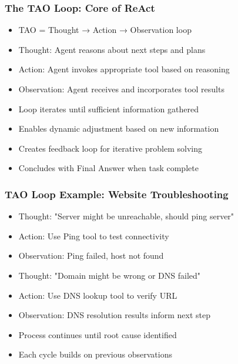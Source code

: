 \begin{frame}[fragile]\frametitle{The TAO Loop: Core of ReAct}
      \begin{itemize}
	  \item TAO = Thought → Action → Observation loop
	  \item Thought: Agent reasons about next steps and plans
	  \item Action: Agent invokes appropriate tool based on reasoning
	  \item Observation: Agent receives and incorporates tool results
	  \item Loop iterates until sufficient information gathered
	  \item Enables dynamic adjustment based on new information
	  \item Creates feedback loop for iterative problem solving
	  \item Concludes with Final Answer when task complete
	  \end{itemize}
\end{frame}

\begin{frame}[fragile]\frametitle{TAO Loop Example: Website Troubleshooting}
      \begin{itemize}
	  \item Thought: "Server might be unreachable, should ping server"
	  \item Action: Use Ping tool to test connectivity
	  \item Observation: Ping failed, host not found
	  \item Thought: "Domain might be wrong or DNS failed"
	  \item Action: Use DNS lookup tool to verify URL
	  \item Observation: DNS resolution results inform next step
	  \item Process continues until root cause identified
	  \item Each cycle builds on previous observations
	  \end{itemize}
\end{frame}

